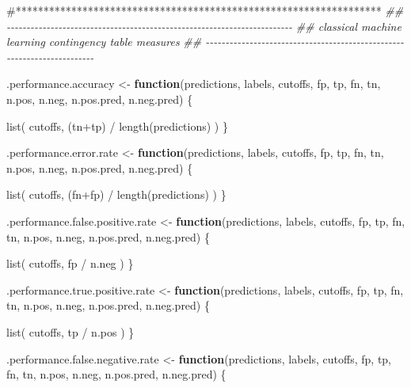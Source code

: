 \documentclass[
  letterpaper,
  DIV=11,
  numbers=noendperiod]{scrartcl}
\newenvironment{Shaded}{\begin{snugshade}}{\end{snugshade}}
\newcommand{\CommentTok}[1]{\textcolor[rgb]{0.37,0.37,0.37}{#1}}
\newcommand{\ControlFlowTok}[1]{\textcolor[rgb]{0.00,0.23,0.31}{\textbf{#1}}}
\newcommand{\DocumentationTok}[1]{\textcolor[rgb]{0.37,0.37,0.37}{\textit{#1}}}
\newcommand{\FunctionTok}[1]{\textcolor[rgb]{0.28,0.35,0.67}{#1}}
\newcommand{\NormalTok}[1]{\textcolor[rgb]{0.00,0.23,0.31}{#1}}
\newcommand{\OtherTok}[1]{\textcolor[rgb]{0.00,0.23,0.31}{#1}}
\newcommand{\SpecialCharTok}[1]{\textcolor[rgb]{0.37,0.37,0.37}{#1}}
\begin{document}
\begin{Shaded}
\begin{Highlighting}[]
\CommentTok{\#******************************************************************}
\DocumentationTok{\#\# {-}{-}{-}{-}{-}{-}{-}{-}{-}{-}{-}{-}{-}{-}{-}{-}{-}{-}{-}{-}{-}{-}{-}{-}{-}{-}{-}{-}{-}{-}{-}{-}{-}{-}{-}{-}{-}{-}{-}{-}{-}{-}{-}{-}{-}{-}{-}{-}{-}{-}{-}{-}{-}{-}{-}{-}{-}{-}{-}{-}{-}{-}{-}{-}{-}{-}{-}{-}{-}{-}{-}{-}}
\DocumentationTok{\#\# classical machine learning contingency table measures}
\DocumentationTok{\#\# {-}{-}{-}{-}{-}{-}{-}{-}{-}{-}{-}{-}{-}{-}{-}{-}{-}{-}{-}{-}{-}{-}{-}{-}{-}{-}{-}{-}{-}{-}{-}{-}{-}{-}{-}{-}{-}{-}{-}{-}{-}{-}{-}{-}{-}{-}{-}{-}{-}{-}{-}{-}{-}{-}{-}{-}{-}{-}{-}{-}{-}{-}{-}{-}{-}{-}{-}{-}{-}{-}{-}{-}}

\NormalTok{.performance.accuracy }\OtherTok{\textless{}{-}}
  \ControlFlowTok{function}\NormalTok{(predictions, labels, cutoffs, fp, tp, fn, tn,}
\NormalTok{           n.pos, n.neg, n.pos.pred, n.neg.pred) \{}
    
      \FunctionTok{list}\NormalTok{( cutoffs, (tn}\SpecialCharTok{+}\NormalTok{tp) }\SpecialCharTok{/} \FunctionTok{length}\NormalTok{(predictions) )}
\NormalTok{  \}}

\NormalTok{.performance.error.rate }\OtherTok{\textless{}{-}}
  \ControlFlowTok{function}\NormalTok{(predictions, labels, cutoffs, fp, tp, fn, tn,}
\NormalTok{           n.pos, n.neg, n.pos.pred, n.neg.pred) \{}

      \FunctionTok{list}\NormalTok{( cutoffs, (fn}\SpecialCharTok{+}\NormalTok{fp) }\SpecialCharTok{/} \FunctionTok{length}\NormalTok{(predictions) )}
\NormalTok{  \}}

\NormalTok{.performance.false.positive.rate }\OtherTok{\textless{}{-}}
  \ControlFlowTok{function}\NormalTok{(predictions, labels, cutoffs, fp, tp, fn, tn,}
\NormalTok{           n.pos, n.neg, n.pos.pred, n.neg.pred) \{}
    
      \FunctionTok{list}\NormalTok{( cutoffs, fp }\SpecialCharTok{/}\NormalTok{ n.neg )}
\NormalTok{  \}}

\NormalTok{.performance.true.positive.rate }\OtherTok{\textless{}{-}}
  \ControlFlowTok{function}\NormalTok{(predictions, labels, cutoffs, fp, tp, fn, tn,}
\NormalTok{           n.pos, n.neg, n.pos.pred, n.neg.pred) \{}
    
      \FunctionTok{list}\NormalTok{( cutoffs, tp }\SpecialCharTok{/}\NormalTok{ n.pos )}
\NormalTok{  \}}

\NormalTok{.performance.false.negative.rate }\OtherTok{\textless{}{-}}
  \ControlFlowTok{function}\NormalTok{(predictions, labels, cutoffs, fp, tp, fn, tn,}
\NormalTok{           n.pos, n.neg, n.pos.pred, n.neg.pred) \{}
    

\end{Highlighting}
\end{Shaded}
\end{document}
